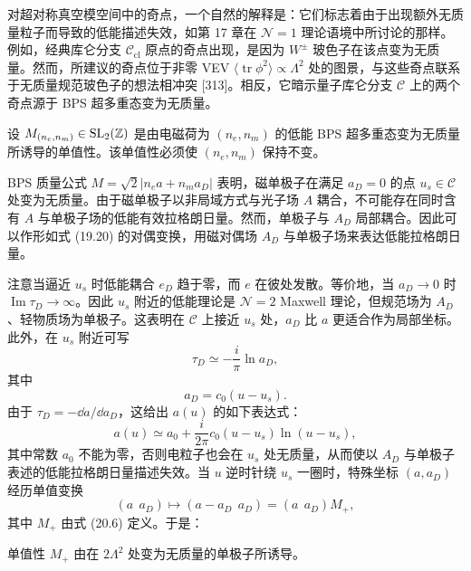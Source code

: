 
对超对称真空模空间中的奇点，一个自然的解释是：它们标志着由于出现额外无质量粒子而导致的低能描述失效，如第 17 章在 $\mathcal{N}=1$ 理论语境中所讨论的那样。例如，经典库仑分支 $\mathcal{C}_{\mathrm{cl}}$ 原点的奇点出现，是因为 $W^\pm$ 玻色子在该点变为无质量。然而，所建议的奇点位于非零 VEV $\langle\operatorname{tr}\phi^2\rangle\propto\Lambda^2$ 处的图景，与这些奇点联系于无质量规范玻色子的想法相冲突 [313]。相反，它暗示量子库仑分支 $\mathcal{C}$ 上的两个奇点源于 BPS 超多重态变为无质量。

设 $M_{(n_e,n_m)}\in\operatorname{SL}_2(\mathbb{Z})$ 是由电磁荷为 $(n_e,n_m)$ 的低能 BPS 超多重态变为无质量所诱导的单值性。该单值性必须使 $(n_e,n_m)$ 保持不变。

BPS 质量公式 $M=\sqrt2|n_ea+n_ma_D|$ 表明，磁单极子在满足 $a_D=0$ 的点 $u_s\in\mathcal{C}$ 处变为无质量。由于磁单极子以非局域方式与光子场 $A$ 耦合，不可能存在同时含有 $A$ 与单极子场的低能有效拉格朗日量。然而，单极子与 $A_D$ 局部耦合。因此可以作形如式 (19.20) 的对偶变换，用磁对偶场 $A_D$ 与单极子场来表达低能拉格朗日量。

注意当逼近 $u_s$ 时低能耦合 $e_D$ 趋于零，而 $e$ 在彼处发散。等价地，当 $a_D\to0$ 时 $\operatorname{Im}\tau_D\to\infty$。因此 $u_s$ 附近的低能理论是 $\mathcal{N}=2$ Maxwell 理论，但规范场为 $A_D$、轻物质场为单极子。这表明在 $\mathcal{C}$ 上接近 $u_s$ 处，$a_D$ 比 $a$ 更适合作为局部坐标。此外，在 $u_s$ 附近可写
\[
\tau_D\simeq-\frac{i}{\pi}\ln a_D,
\]
其中
\[
a_D=c_0(u-u_s).
\]
由于 $\tau_D=-\dd a/\dd a_D$，这给出 $a(u)$ 的如下表达式：
\[
a(u)\simeq a_0+\frac{i}{2\pi}c_0(u-u_s)\ln(u-u_s),
\]
其中常数 $a_0$ 不能为零，否则电粒子也会在 $u_s$ 处无质量，从而使以 $A_D$ 与单极子表述的低能拉格朗日量描述失效。当 $u$ 逆时针绕 $u_s$ 一圈时，特殊坐标 $(a,a_D)$ 经历单值变换
\[
(a\ \ a_D)\longmapsto(a-a_D\ \ a_D)=(a\ \ a_D)M_+,
\]
其中 $M_+$ 由式 (20.6) 定义。于是：

\begin{proposition}[20.8]
单值性 $M_+$ 由在 $2\Lambda^2$ 处变为无质量的单极子所诱导。
\end{proposition}

